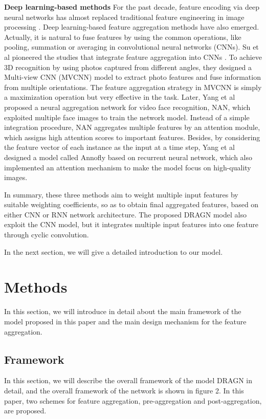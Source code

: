 \documentclass[10pt,twocolumn,letterpaper]{article}
\begin{document}
\textbf{Deep learning-based methods} For the past decade, feature encoding via deep neural networks has almost replaced traditional feature engineering in image processing \cite{ref16, ref19, ref20}. Deep learning-based feature aggregation methods have also emerged. Actually, it is natural to fuse features by using the common operations, like pooling, summation or averaging in convolutional neural networks (CNNs). Su et al pioneered the studies that integrate feature aggregation into CNNs \cite{ref23}. To achieve 3D recognition by using photos captured from different angles, they designed a Multi-view CNN (MVCNN) model to extract photo features and fuse information from multiple orientations. The feature aggregation strategy in MVCNN is simply a maximization operation but very effective in the task. Later, Yang et al proposed a neural aggregation network for video face recognition, NAN\cite{ref24}, which exploited multiple face images to train the network model. Instead of a simple integration procedure, NAN aggregates multiple features by an attention module, which assigns high attention scores to important features.
Besides, by considering the feature vector of each instance as the input at a time step, Yang et al designed a model called Annofly \cite{annofly} based on recurrent neural network, which also implemented an attention mechanism to make the model focus on high-quality images.

In summary, these three methods aim to weight multiple input features by suitable weighting coefficients, so as to obtain final aggregated features, based on either CNN or RNN network architecture. The proposed DRAGN model also exploit the CNN model, but it integrates multiple input features into one feature through cyclic convolution.



In the next section, we will give a detailed introduction to our model.

\section{Methods}
In this section, we will introduce in detail about the main framework of the model proposed in this paper and the main design mechanism for the feature aggregation.

\subsection{Framework}
In this section, we will describe the overall framework of the model DRAGN in detail, and the overall framework of the network is shown in figure 2. In this paper, two schemes for feature aggregation, pre-aggregation and post-aggregation, are proposed.
\end{document}
